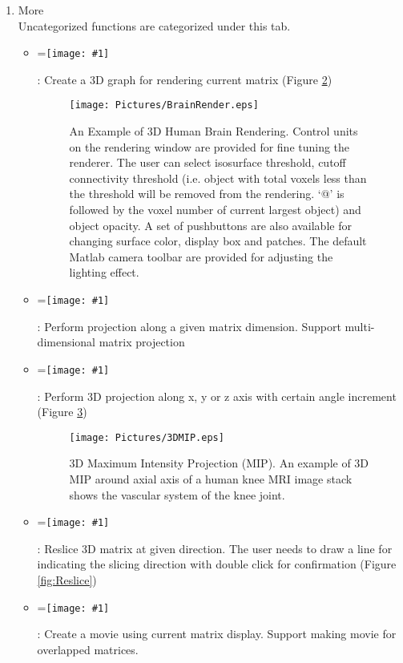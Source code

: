 \documentclass{book}%
\newcommand{\vcenteredinclude}[1]{
\begingroup
\setbox0=\hbox{\texttt{[image: \#1]}}
\parbox{\wd0}{\box0}\endgroup}
\begin{document}
\begin{enumerate}
\begin{figure}[htbp]
	\centering
		\texttt{[image: Pictures/matlabIM.eps]}
	\caption{Matlab Tools}
	\label{fig:matlabIM}
\end{figure}	
	
	\item More \\

	Uncategorized functions are categorized under this tab.
	
	\begin{itemize}
		\item \vcenteredinclude{Pictures/3DRender.eps} : Create a 3D graph for rendering current matrix (Figure \ref{fig:BrainRender})
		
		\begin{figure}[htbp]
			\centering
			\texttt{[image: Pictures/BrainRender.eps]}
			\caption{An Example of 3D Human Brain Rendering. Control units on the rendering window are provided for fine tuning the renderer. The user can select isosurface threshold, cutoff connectivity threshold (i.e. object with total voxels less than the threshold will be removed from the rendering. `@' is followed by the voxel number of current largest object) and object opacity. A set of pushbuttons are also available for changing surface color, display box and patches. The default Matlab camera toolbar are provided for adjusting the lighting effect.}
			\label{fig:BrainRender}
		\end{figure}	
		
		\item \vcenteredinclude{Pictures/MIP.eps} : Perform projection along a given matrix dimension. Support multi-dimensional matrix projection
		\item \vcenteredinclude{Pictures/MIP3D.eps} : Perform 3D projection along x, y or z axis with certain angle increment (Figure \ref{fig:3DMIP})
		
		
		\begin{figure}[htbp]
			\centering
				\texttt{[image: Pictures/3DMIP.eps]}
			\caption{3D Maximum Intensity Projection (MIP). An example of 3D MIP around axial axis of a human knee MRI image stack shows the vascular system of the knee joint.}
			\label{fig:3DMIP}
		\end{figure}	
		
		\item \vcenteredinclude{Pictures/3DReslice.eps} : Reslice 3D matrix at given direction. The user needs to draw a line for indicating the slicing direction with double click for confirmation (Figure \ref{fig:Reslice})
		\item \vcenteredinclude{Pictures/Moive.eps} : Create a movie using current matrix display. Support making movie for overlapped matrices.
	\end{itemize}
	

\end{enumerate}
\end{document}
